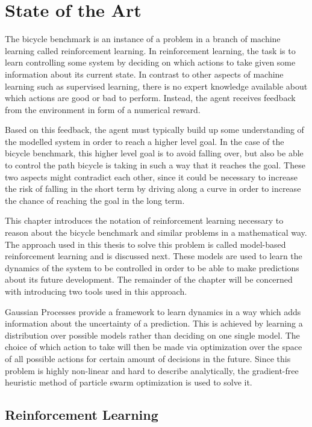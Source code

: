 \chapter{State of the Art}
\label{cha:state_of_the_art}
The bicycle benchmark is an instance of a problem in a branch of machine learning called reinforcement learning.
In reinforcement learning, the task is to learn controlling some system by deciding on which actions to take given some information about its current state.
In contrast to other aspects of machine learning such as supervised learning, there is no expert knowledge available about which actions are good or bad to perform.
Instead, the agent receives feedback from the environment in form of a numerical reward.

Based on this feedback, the agent must typically build up some understanding of the modelled system in order to reach a higher level goal.
In the case of the bicycle benchmark, this higher level goal is to avoid falling over, but also be able to control the path bicycle is taking in such a way that it reaches the goal.
These two aspects might contradict each other, since it could be necessary to increase the risk of falling in the short term by driving along a curve in order to increase the chance of reaching the goal in the long term.

This chapter introduces the notation of reinforcement learning necessary to reason about the bicycle benchmark and similar problems in a mathematical way.
The approach used in this thesis to solve this problem is called model-based reinforcement learning and is discussed next.
These models are used to learn the dynamics of the system to be controlled in order to be able to make predictions about its future development.
The remainder of the chapter will be concerned with introducing two tools used in this approach.

Gaussian Processes provide a framework to learn dynamics in a way which adds information about the uncertainty of a prediction.
This is achieved by learning a distribution over possible models rather than deciding on one single model.
The choice of which action to take will then be made via optimization over the space of all possible actions for certain amount of decisions in the future.
Since this problem is highly non-linear and hard to describe analytically, the gradient-free heuristic method of particle swarm optimization is used to solve it.

\section{Reinforcement Learning}
